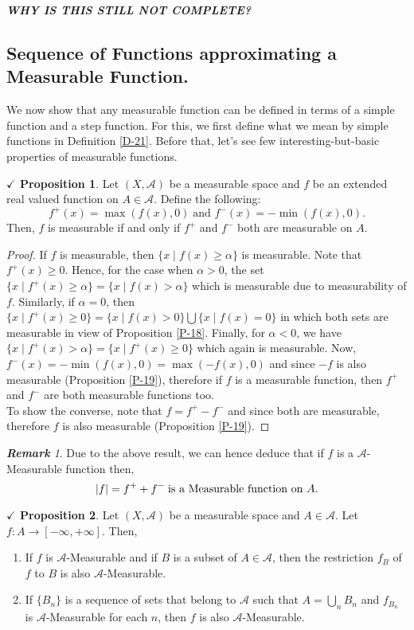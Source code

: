\documentclass{article}
\theoremstyle{definition}
\theoremstyle{remark}
\newtheorem*{remark}{\textbf{Remark}}
\theoremstyle{definition}
\theoremstyle{definition}
\newtheorem{proposition}{$\checkmark$ Proposition}
\theoremstyle{definition}
\DeclarePairedDelimiter\abs{\lvert}{\rvert}
\newcommand{\bunion}{\bigcup}
\newcommand{\where}{\;\vert\;}
\newcommand{\alg}[1]{\mathscr{#1}}
\begin{document}
\emph{\textbf{WHY IS THIS STILL NOT COMPLETE?}}
\newpage
\subsection{Sequence of Functions approximating a Measurable Function.}
We now show that any measurable function can be defined in terms of a simple function and a step function. For this, we first define what we mean by simple functions in Definition \ref{D-21}. Before that, let's see few interesting-but-basic properties of measurable functions. 
\begin{proposition}\label{P-25}
	Let $ (X,\alg{A}) $ be a measurable space and $ f $ be an extended real valued function on $ A\in \alg{A} $. Define the following:
	\[f^{+}(x) = \max (f(x),0)\;\text{and } f^{-}(x) = -\min (f(x),0).\]
	Then, $ f $ is measurable if and only if $ f^{+} $ and $ f^{-} $ both are measurable on $ A $.
\end{proposition}
\begin{proof}
	If $ f $ is measurable, then $ \{x\where f(x)\ge \alpha\} $ is measurable. Note that $ f^{+}(x) \ge 0$. Hence, for the case when $ \alpha > 0 $, the set $ \{x\where f^{+}(x)\ge \alpha\} = \{x\where f(x) > \alpha\}$ which is measurable due to measurability of $ f $. Similarly, if $ \alpha = 0 $, then $ \{x\where f^{+}(x)\ge 0\} = \{x\where f(x)> 0\} \bunion \{x\where f(x) = 0\} $ in which both sets are measurable in view of Proposition \ref{P-18}. Finally, for $ \alpha<0 $, we have $ \{x\where f^{+}(x)> \alpha\} = \{x\where f^{+}(x)\ge 0\}$ which again is measurable. Now, $ f^{-}(x) = -\min(f(x),0) = \max(-f(x),0)$ and since $ -f $ is also measurable (Proposition \ref{P-19}), therefore if $ f $ is a measurable function, then $ f^{+} $ and $ f^{-} $ are both measurable functions too.\\
	To show the converse, note that $ f = f^{+} - f^{-} $ and since both are measurable, therefore $ f $ is also measurable (Proposition \ref{P-19}).
\end{proof}
\begin{remark}
	Due to the above result, we can hence deduce that if $ f $ is a $ \alg{A} $-Measurable function then,
	\[\abs{f} = f^{+} + f^{-}\;\text{is a Measurable function on $ A $.}\]
\end{remark}
\hrulefill
\begin{proposition}
	Let $ (X,\alg{A}) $ be a measurable space and $ A\in \alg{A} $. Let $ f : A\to [-\infty,+\infty]$. Then,
	\begin{enumerate}
		\item {If $ f $ is $ \alg{A} $-Measurable and if $ B $ is a subset of $ A \in \alg{A}$, then the restriction $ f_{B} $ of $ f $ to $ B $ is also $ \alg{A} $-Measurable. }
		\item {If $ \{B_n\} $ is a sequence of sets that belong to $ \alg{A} $ such that $ A = \bunion_{n}B_n $ and $ f_{B_n} $ is $ \alg{A}$-Measurable for each $ n $, then $ f $ is also $ \alg{A} $-Measurable.}
	\end{enumerate}
\end{proposition}
\end{document}
